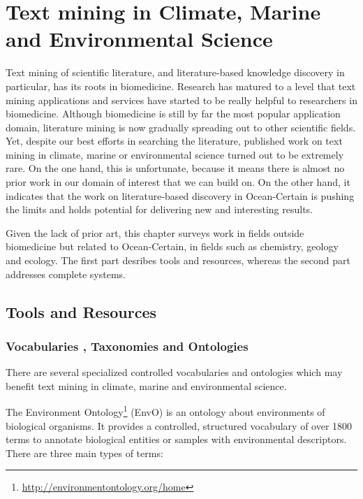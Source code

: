 \chapter{Text mining in Climate, Marine and Environmental Science}


Text mining of scientific literature, and literature-based knowledge discovery in particular, has its roots in biomedicine.
Research has matured to a level that text mining applications and services have started to be really helpful to researchers in biomedicine.
Although biomedicine is still by far the most popular application domain, literature mining is now gradually spreading out to other scientific fields.
Yet, despite our best efforts in searching the literature, published work on text mining in climate, marine or environmental science turned out to be extremely rare.
On the one hand, this is unfortunate, because it means there is almost no prior work in our domain of interest that we can build on.
On the other hand, it indicates that the work on literature-based discovery in Ocean-Certain is pushing the limits and holds potential for delivering new and interesting results.

Given the lack of prior art, this chapter surveys work in fields outside biomedicine but related to Ocean-Certain, in fields such as chemistry, geology and ecology.
The first part desribes tools and resources, whereas the second part addresses complete systems. 

\section{Tools and Resources}

\subsection{Vocabularies , Taxonomies and Ontologies}

There are several specialized controlled vocabularies and ontologies which may benefit text mining in climate, marine and environmental science.
 
The Environment Ontology\footnote{\url{http://environmentontology.org/home}} (EnvO) is an ontology about environments  \citep{Buttigieg2013Environment} of biological organisms.
It provides a controlled, structured vocabulary of over 1800 terms to annotate biological entities or samples with environmental descriptors.
There are three main types of terms:

